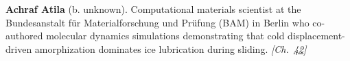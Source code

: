 \textbf{Achraf Atila} (b. unknown). Computational materials scientist at the Bundesanstalt f\"{u}r Materialforschung und Pr\"{u}fung (BAM) in Berlin who co-authored molecular dynamics simulations demonstrating that cold displacement-driven amorphization dominates ice lubrication during sliding. \emph{[Ch.~\hyperref[ch:iceslipperiness]{42}]}

